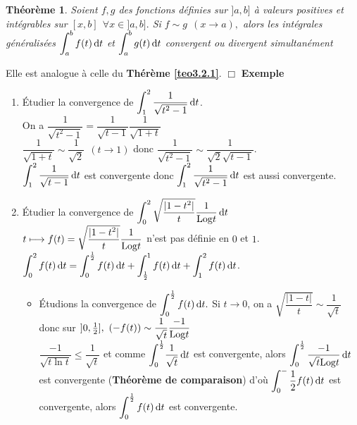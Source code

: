 \documentclass[11pt, a4paper]{book}
\newtheorem{teo}{Th\'eor\`eme}[section]
\newenvironment{pr}{\noindent {\bf Preuve} \noindent} {\hfill $\Box$\vskip 5mm}
\begin{document}
\begin{teo} \label{teo3.2.2}
Soient $f,g$ des fonctions d\'efinies sur $]a,b]$ \`a valeurs positives et int\'egrables sur $[x,b]~~\forall x\in ]a,b].$ Si $f\sim g ~~(x\rightarrow a),$ alors les int\'egrales g\'en\'eralis\'ees ${\displaystyle \int_a^b f(t)\,\mathrm{d} t}$ et ${\displaystyle \int_a^b g(t)\,\mathrm{d} t}$ convergent ou divergent simultan\'ement
\end{teo}
\begin{pr}\quad
Elle est analogue \`a celle du \textbf{Th\'er\`eme \ref{teo3.2.1}}.
\end{pr}
\textbf{Exemple}
\begin{enumerate}
\item \'Etudier la convergence de ${\displaystyle \int^2_1 \dfrac{1}{\sqrt{t^2-1}}\,\mathrm{d} t}$.\\
On a $\dfrac{1}{\sqrt{t^2-1}}=\dfrac{1}{\sqrt{t-1}}\dfrac{1}{\sqrt{1+t}}$\\
$\dfrac{1}{\sqrt{1+t}}\sim \dfrac{1}{\sqrt{2}} ~ ~ (t\rightarrow 1)$ donc $\dfrac{1}{\sqrt{t^2-1}} \sim \dfrac{1}{\sqrt{2}\sqrt{t-1}}$.\\
${\displaystyle \int_1^2 \dfrac{1}{\sqrt{t-1}}\,\mathrm{d} t}$ est convergente donc ${\displaystyle \int_1^2\dfrac{1}{\sqrt{t^2-1}}}\,\mathrm{d} t$ est aussi convergente.
\item \'Etudier la convergence de ${\displaystyle \int_0^2\sqrt{\dfrac{|1-t^2|}{t}}\dfrac{1}{\mathrm{Log} t}\,\mathrm{d} t}$\\
$t\longmapsto f(t)=\sqrt{\dfrac{|1-t^2|}{t}}\dfrac{1}{\mathrm{Log} t}$ n'est pas d\'efinie en $0$ et $1$.\\
${\displaystyle \int_0^2 f(t)\,\mathrm{d} t=\int_0^\frac{1}{2} f(t)\,\mathrm{d} t +\int_\frac{1}{2}^1f(t)\,\mathrm{d} t +\int_1^2f(t)\,\mathrm{d} t}$.\\
\begin{itemize}
\item \'Etudions la convergence de ${\displaystyle \int_0^\frac{1}{2}f(t)\,\mathrm{d} t.} $  Si $t\longrightarrow 0$, on a $\sqrt{\dfrac{|1-t|}{t}} \sim \dfrac{1}{\sqrt{t}}$ donc sur $]0,\frac{1}{2}],~ (-f(t))\sim \dfrac{1}{\sqrt{t}}\dfrac{-1}{\mathrm{Log} t}$\\
$\dfrac{-1}{\sqrt{t\ln t}}\leq \dfrac{1}{\sqrt{t}}$ et comme ${\displaystyle \int_0^\frac{1}{2}}\dfrac{1}{\sqrt{t}}\,\mathrm{d} t$ est convergente, alors ${\displaystyle \int_0^\frac{1}{2}\dfrac{-1}{\sqrt{t}\mathrm{Log} t}\,\mathrm{d} t}$ est convergente (\textbf{Th\'eor\`eme de comparaison}) d'o\`u  ${\displaystyle \int_0^-\frac{1}{2}f(t)\,\mathrm{d} t}$ est convergente, alors ${\displaystyle \int_0^\frac{1}{2}f(t)\,\mathrm{d} t}$ est convergente.

\end{itemize}
\end{enumerate}
\end{document}
